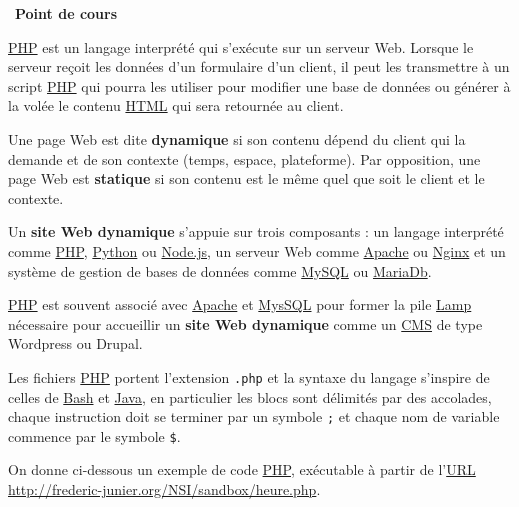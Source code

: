 \documentclass[
  11pt,
]{article}
\newcommand{\passthrough}[1]{#1}
\newcounter{cours}
\newenvironment{cours}[1]
{\par \medskip   \addtocounter{cours}{1} \noindent  
\begin{bclogo}[arrondi =0.1,  ombre = true, barre=none, logo=\bcbook, marge=4]{~\textbf{Point de cours} \textbf{\thecours} {\itshape #1} }  \par}
{
\end{bclogo}
 \par \bigskip }
\begin{document}
\begin{cours}{}

\href{https://developer.mozilla.org/fr/docs/Glossaire/PHP}{PHP} est un
langage interprété qui s'exécute sur un serveur Web. Lorsque le serveur
reçoit les données d'un formulaire d'un client, il peut les transmettre
à un script
\href{https://developer.mozilla.org/fr/docs/Glossaire/PHP}{PHP} qui
pourra les utiliser pour modifier une base de données ou générer à la
volée le contenu
\href{https://developer.mozilla.org/fr/docs/Glossaire/HTML}{HTML} qui
sera retournée au client.

Une page Web est dite \textbf{dynamique} si son contenu dépend du client
qui la demande et de son contexte (temps, espace, plateforme). Par
opposition, une page Web est \textbf{statique} si son contenu est le
même quel que soit le client et le contexte.

Un \textbf{site Web dynamique} s'appuie sur trois composants : un
langage interprété comme
\href{https://developer.mozilla.org/fr/docs/Glossaire/PHP}{PHP},
\href{https://docs.python.org/3.7/library/cgi.html}{Python} ou
\href{https://developer.mozilla.org/fr/docs/Glossaire/Node.js}{Node.js},
un serveur Web comme \href{https://doc.ubuntu-fr.org/apache2}{Apache} ou
\href{https://doc.ubuntu-fr.org/nginx}{Nginx} et un système de gestion
de bases de données comme \href{https://doc.ubuntu-fr.org/mysql}{MySQL}
ou \href{https://doc.ubuntu-fr.org/mariadb}{MariaDb}.

\href{https://developer.mozilla.org/fr/docs/Glossaire/PHP}{PHP} est
souvent associé avec \href{https://doc.ubuntu-fr.org/apache2}{Apache} et
\href{https://doc.ubuntu-fr.org/mysql}{MysSQL} pour former la pile
\href{https://doc.ubuntu-fr.org/lamp}{Lamp} nécessaire pour accueillir
un \textbf{site Web dynamique} comme un
\href{https://developer.mozilla.org/fr/docs/Glossaire/CMS}{CMS} de type
Wordpress ou Drupal.

Les fichiers
\href{https://developer.mozilla.org/fr/docs/Glossaire/PHP}{PHP} portent
l'extension \passthrough{\lstinline!.php!} et la syntaxe du langage
s'inspire de celles de \href{https://doc.ubuntu-fr.org/bash}{Bash} et
\href{https://developer.mozilla.org/fr/docs/Glossaire/Java}{Java}, en
particulier les blocs sont délimités par des accolades, chaque
instruction doit se terminer par un symbole \passthrough{\lstinline!;!}
et chaque nom de variable commence par le symbole
\passthrough{\lstinline!$!}.

On donne ci-dessous un exemple de code
\href{https://developer.mozilla.org/fr/docs/Glossaire/PHP}{PHP},
exécutable à partir de
l'\href{https://developer.mozilla.org/fr/docs/Glossaire/URL}{URL}
\url{http://frederic-junier.org/NSI/sandbox/heure.php}.


\end{cours}
\end{document}
